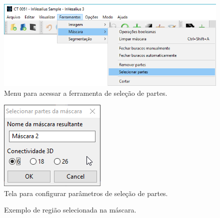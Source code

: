 \begin{figure}[!htb]
\centering
\includegraphics[scale=0.4]{../user_guide_figures/invesalius_screen/menu_mask_select_part_pt.png}
\caption{Menu para acessar a ferramenta de seleção de partes.}
\label{fig:menu_mask_select_part}
\end{figure}

\begin{figure}[!htb]
\centering
\includegraphics[scale=0.7]{../user_guide_figures/invesalius_screen/mask_select_part_pt.png}
\caption{Tela para configurar parâmetros de seleção de partes.}
\label{fig:mask_select_part}
\end{figure}

\begin{figure}[!htb]
  \centering
    \qquad
  \hfill
  \caption{Exemplo de região selecionada na máscara.}
  \label{fig:mask_selected_part}
\end{figure}

